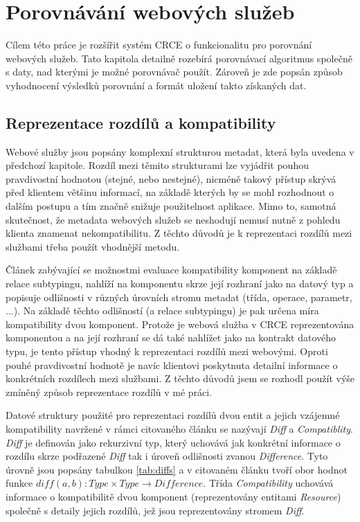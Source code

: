 \documentclass[czech,DP]{thesiskiv}
\begin{document}
\chapter{Porovnávání webových služeb}

Cílem této práce je rozšířit systém CRCE o funkcionalitu pro porovnání webových služeb. Tato kapitola detailně rozebírá porovnávací algoritmus společně s daty, nad kterými je možné porovnávač použít. Zároveň je zde popsán způsob vyhodnocení výsledků porovnání a formát uložení takto získaných dat.

\section{Reprezentace rozdílů a kompatibility}
\label{sec:diff-info}
Webové služby jsou popsány komplexní strukturou metadat, která byla uvedena v předchozí kapitole. Rozdíl mezi těmito strukturami lze vyjádřit pouhou pravdivostní hodnotou (stejné, nebo nestejné), nicméně takový přístup skrývá před klientem většinu informací, na základě kterých by se mohl rozhodnout o dalším postupu a tím značně snižuje použitelnost aplikace. Mimo to, samotná skutečnost, že metadata webových služeb se neshodují nemusí nutně z pohledu klienta znamenat nekompatibilitu. Z těchto důvodů je k reprezentaci rozdílů mezi službami třeba použít vhodnější metodu.

Článek \cite{brada2006diff} zabývající se možnostmi evaluace kompatibility komponent na základě relace subtypingu, nahlíží na komponentu skrze její rozhraní jako na datový typ a popisuje odlišnosti v různých úrovních stromu metadat (třída, operace, parametr, ...). Na základě těchto odlišností (a relace subtypingu) je pak určena míra kompatibility dvou komponent. Protože je webová služba v CRCE reprezentována komponentou a na její rozhraní se dá také nahlížet jako na kontrakt datového typu, je tento přístup vhodný k reprezentaci rozdílů mezi webovými. Oproti pouhé pravdivostní hodnotě je navíc klientovi poskytnuta detailní informace o konkrétních rozdílech mezi službami. Z těchto důvodů jsem se rozhodl použít výše zmíněný způsob reprezentace rozdílů v mé práci. 

Datové struktury použité pro reprezentaci rozdílů dvou entit a jejich vzájemné kompatibility navržené v rámci citovaného článku se nazývají \textit{Diff} a \textit{Compatiblity}. \textit{Diff} je definován jako rekurzivní typ, který uchovává jak konkrétní informace o rozdílu skrze podřazené \textit{Diff} tak i úroveň odlišnosti zvanou \textit{Difference}. Tyto úrovně jsou popsány tabulkou \ref{tab:diffs} a v citovaném článku tvoří obor hodnot funkce $diff(a,b): Type \times Type \rightarrow Difference$. Třída \textit{Compatibility} uchovává informace o kompatibilitě dvou komponent (reprezentovány entitami \textit{Resource}) společně s detaily jejich rozdílů, jež jsou reprezentovány stromem \textit{Diff}.
\end{document}
